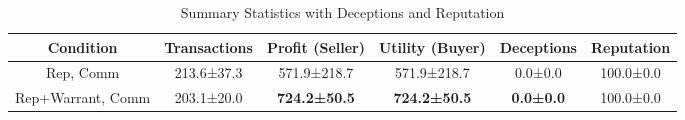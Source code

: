 \begin{table}[t]
    \centering
    \caption{Summary Statistics with Deceptions and Reputation}
    \label{tab:rq3_summary_stats}
    \begin{tabular}{cccccc}
    \toprule
    \textbf{Condition} & \textbf{Transactions} & \textbf{Profit (Seller)} & \textbf{Utility (Buyer)} & \textbf{Deceptions} & \textbf{Reputation} \\
    \midrule
    Rep, Comm & 213.6±37.3 & 571.9±218.7 & 571.9±218.7 & 0.0±0.0 & 100.0±0.0 \\
    Rep+Warrant, Comm & 203.1±20.0 & \textbf{724.2±50.5} & \textbf{724.2±50.5} & \textbf{0.0±0.0} & 100.0±0.0 \\
    \bottomrule
    \end{tabular}
\end{table}

